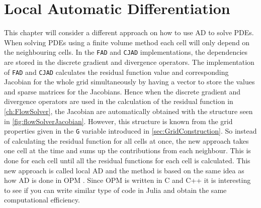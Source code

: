 \chapter{Local Automatic Differentiation}
\label{ch:LocalAD}
This chapter will consider a different approach on how to use AD to solve PDEs. When solving PDEs using a finite volume method each cell will only depend on the neighbouring cells. In the \texttt{FAD} and \texttt{CJAD} implementations, the dependencies are stored in the discrete gradient and divergence operators. The implementation of \texttt{FAD} and \texttt{CJAD} calculates the residual function value and corresponding Jacobian for the whole grid simultaneously by having a vector to store the values and sparse matrices for the Jacobians. Hence when the discrete gradient and divergence operators are used in the calculation of the residual function in \autoref{ch:FlowSolver}, the Jacobian are automatically obtained with the structure seen in \autoref{fig:flowSolverJacobian}. However, this structure is known from the grid properties given in the \texttt{G} variable introduced in \autoref{sec:GridConstruction}. So instead of calculating the residual function for all cells at once, the new approach takes one cell at the time and sums up the contributions from each neighbour. This is done for each cell until all the residual functions for each cell is calculated. This new approach is called local AD and the method is based on the same idea as how AD is done in OPM \emph{\citep{OPM}}. Since OPM is written in C and C++ it is interesting to see if you can write similar type of code in Julia and obtain the same computational efficiency. 

